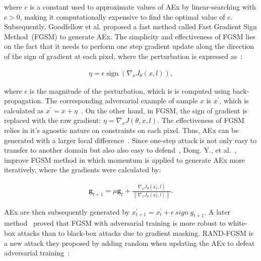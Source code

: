 \hspace*{3.5mm} where $c$ is a constant used to approximate values of AEx by linear-searching with $c > 0$, making it computationally expensive to find the optimal value of $c$. Subsequently, Goodfellow et al.\cite{goodfellow2014explaining} proposed a fast method called Fast Gradient Sign Method~(FGSM) to generate AEx. The simplicity and effectiveness of FGSM lies on the fact that it needs to perform one step gradient update along the direction of the sign of gradient at each pixel, where the perturbation is expressed as~\cite{goodfellow2014explaining}: 

\vspace{-6mm}
\begin{align}
    \eta=\epsilon \operatorname{sign}\left(\nabla_{x} J_{\theta}(x, l)\right),
    \label{eq:fgsm_eta}
\end{align}

\hspace*{3.5mm} where $\epsilon$ is the magnitude of the perturbation, which is is computed using back-propagation. The corresponding adversarial example of sample $x$ is $x^{\prime}$, which is calculated as $x^{\prime}=x+\eta$~\cite{yuan2019adversarial}. On the other hand, in FGSM, the sign of gradient is replaced with the raw gradient: $\eta=\nabla_{x} J(\theta, x, l)$. The effectiveness of FGSM relies in it's agnostic nature on constraints on each pixel. Thus, AEx can be generated with a larger local difference~\cite{yuan2019adversarial}. Since one-step attack is not only easy to transfer to another domain but also also easy to defend~\cite{yuan2019adversarial}, Dong. Y., et al.~\cite{dong2018boosting}, improve FGSM method in which momentum is applied to generate AEx more iteratively, where the gradients were calculated by:

\vspace{-6mm}
\begin{align}
    \mathbf{g}_{t+1}=\mu \mathbf{g}_{t}+\frac{\nabla_{x} J_{\theta}\left(x_{t}^{\prime}, l\right)}{\left\|\nabla_{x} J_{\theta}\left(x_{t}^{\prime}, l\right)\right\|}.
\end{align}

\hspace*{3.5mm} AEx are then subsequently generated by $x_{t+1}^{\prime}=x_{t}^{\prime} + \epsilon~sign~g_{t+1}$. A later method~\cite{tramer2017ensemble} proved that FGSM with adversarial training is more robust to white-box attacks than to black-box attacks due to gradient masking. RAND-FGSM is a new attack they proposed by adding random when updating the AEx to defeat adversarial training~\cite{yuan2019adversarial}:

